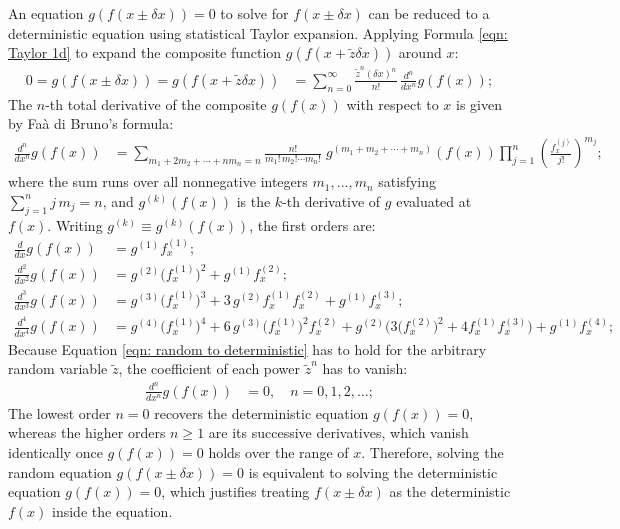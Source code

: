 \documentclass[twoside]{article}
\numberwithin{equation}{section}
\begin{document}
An equation $g(f(x \pm \delta x)) = 0$ to solve for $f(x \pm \delta x)$ can be reduced to a deterministic equation using statistical Taylor expansion.
Applying Formula \eqref{eqn: Taylor 1d} to expand the composite function $g(f(x + \tilde{z} \delta x))$ around $x$:
\begin{align}
\label{eqn: random to deterministic}
0 = g(f(x \pm \delta x)) = g(f(x + \tilde{z} \delta x))
   &= \sum_{n=0}^{\infty} \frac{\tilde{z}^n (\delta x)^n}{n!} \, \frac{d^n}{d x^n} g(f(x));
\end{align}
The $n$-th total derivative of the composite $g(f(x))$ with respect to $x$ is given by Fa\`a di Bruno's formula:
\begin{align}
\label{eqn: Faa di Bruno}
\frac{d^n}{d x^n} g(f(x)) &= \sum_{m_1 + 2 m_2 + \cdots + n m_n = n} \frac{n!}{m_1! \, m_2! \cdots m_n!} \; g^{(m_1 + m_2 + \cdots + m_n)}(f(x)) \prod_{j=1}^{n} \left(\frac{f^{(j)}_x}{j!}\right)^{m_j};
\end{align}
where the sum runs over all nonnegative integers $m_1, \dots, m_n$ satisfying $\sum_{j=1}^{n} j \, m_j = n$, and $g^{(k)}(f(x))$ is the $k$-th derivative of $g$ evaluated at $f(x)$.
Writing $g^{(k)} \equiv g^{(k)}(f(x))$, the first orders are:
\begin{align}
\label{eqn: composite derivative 1}
\frac{d}{d x} g(f(x)) &= g^{(1)} f^{(1)}_x; \\
\label{eqn: composite derivative 2}
\frac{d^2}{d x^2} g(f(x)) &= g^{(2)} \big(f^{(1)}_x\big)^2 + g^{(1)} f^{(2)}_x; \\
\label{eqn: composite derivative 3}
\frac{d^3}{d x^3} g(f(x)) &= g^{(3)} \big(f^{(1)}_x\big)^3 + 3\, g^{(2)} f^{(1)}_x f^{(2)}_x + g^{(1)} f^{(3)}_x; \\
\label{eqn: composite derivative 4}
\frac{d^4}{d x^4} g(f(x)) &= g^{(4)} \big(f^{(1)}_x\big)^4 + 6\, g^{(3)} \big(f^{(1)}_x\big)^2 f^{(2)}_x + g^{(2)} \big(3 \big(f^{(2)}_x\big)^2 + 4 f^{(1)}_x f^{(3)}_x\big) + g^{(1)} f^{(4)}_x;
\end{align}
Because Equation \eqref{eqn: random to deterministic} has to hold for the arbitrary random variable $\tilde{z}$, the coefficient of each power $\tilde{z}^n$ has to vanish:
\begin{align}
\label{eqn: random to deterministic condition}
\frac{d^n}{d x^n} g(f(x)) &= 0, \quad n = 0, 1, 2, \dots;
\end{align}
The lowest order $n = 0$ recovers the deterministic equation $g(f(x)) = 0$, whereas the higher orders $n \geq 1$ are its successive derivatives, which vanish identically once $g(f(x)) = 0$ holds over the range of $x$.
Therefore, solving the random equation $g(f(x \pm \delta x)) = 0$ is equivalent to solving the deterministic equation $g(f(x)) = 0$, which justifies treating $f(x \pm \delta x)$ as the deterministic $f(x)$ inside the equation.
\end{document}
